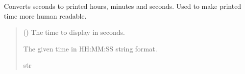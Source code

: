 \documentclass[letterpaper,10pt,english]{sphinxmanual}
\begin{document}

\begin{fulllineitems}
\label{\detokenize{modules/simulation/display:qnav.simulation.display.sec_to_str}}
\pysigstartsignatures
{}
\pysigstopsignatures
\sphinxAtStartPar
Converts seconds to printed hours, minutes and seconds.
Used to make printed time more human readable.
\begin{quote}\begin{description}
\sphinxAtStartPar
{} () \textendash{} The time to display in seconds.

\sphinxAtStartPar
The given time in HH:MM:SS string format.

\sphinxAtStartPar
str

\end{description}\end{quote}

\end{fulllineitems}

\end{document}
